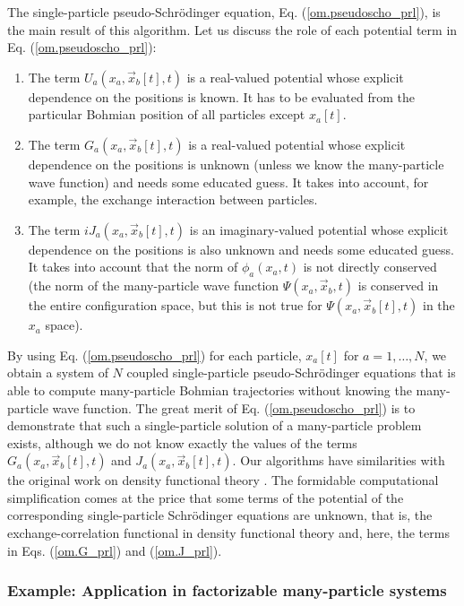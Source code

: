 \documentclass[nofootinbib, secnumarabic, amsmath, nobibnotes,11pt,aps,pra, floatfix]{revtex4-1}
\newcommand{\eref}[1]{Eq. (\ref{#1})}
\begin{document}
The single-particle pseudo-Schr\"odinger equation,
\eref{om.pseudoscho_prl}, is the main result of this algorithm. Let
us discuss the role of each potential term in
\eref{om.pseudoscho_prl}:
\begin{enumerate}
\item The term \textit{$U_{a}(x_{a},\vec x_{b}[t],t)$} is a real-valued potential whose explicit dependence on the positions is known. It has to be evaluated from the particular Bohmian position of all particles except $x_a[t]$.

\item The term \textit{$G_{a}(x_{a},\vec x_{b}[t],t)$} is a real-valued potential whose explicit dependence on the positions is unknown (unless we know the many-particle wave function) and needs some educated guess. It takes into account, for example, the exchange interaction between particles.

\item The term \textit{$i J_{a}(x_{a},\vec x_{b}[t],t)$} is an imaginary-valued potential whose explicit dependence on the positions is also unknown and needs some educated guess. It takes into account that the norm of $\phi_{a}(x_{a},t)$ is not directly conserved (the norm of the many-particle wave function $\Psi(x_a,\vec x_b,t)$ is conserved in the entire configuration space, but this is not true for $\Psi(x_a,\vec x_b[t],t)$ in the $x_a$ space).
\end{enumerate}

By using \eref{om.pseudoscho_prl} for each particle, $x_a[t]$ for $a = 1,\ldots,N$, we obtain a  system of $N$ coupled single-particle pseudo-Schr\"odinger equations that is able to compute many-particle Bohmian trajectories without knowing the many-particle wave function. The great merit of \eref{om.pseudoscho_prl} is to demonstrate that such a single-particle solution of a many-particle problem exists, although we do not know exactly the values of the terms $G_{a}(x_{a}, \vec x_{b}[t],t)$ and $J_{a}(x_{a},\vec x_{b}[t],t)$. Our algorithms have similarities with the original work on density functional theory \cite{om.kohn1964,om.kohn1965}. The formidable computational simplification comes at the price that some terms of the potential of the corresponding single-particle Schr\"odinger equations are unknown, that is, the exchange-correlation functional in density functional theory \cite{om.kohn1964,om.kohn1965} and, here, the terms in Eqs. (\ref{om.G_prl}) and (\ref{om.J_prl}).

\subsubsection{Example: Application in factorizable many-particle systems}
\end{document}
